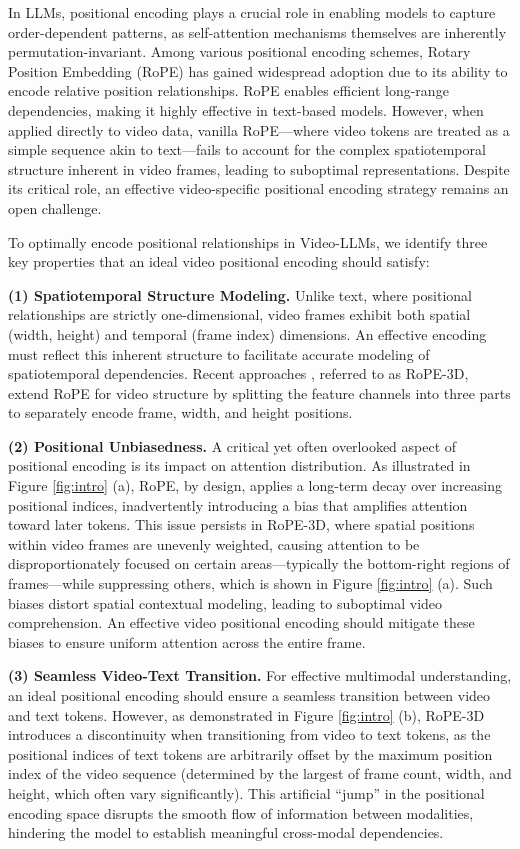\documentclass[11pt]{article}
\begin{document}
In LLMs, positional encoding plays a crucial role in enabling models to capture order-dependent patterns, as self-attention mechanisms themselves are inherently permutation-invariant. Among various positional encoding schemes, Rotary Position Embedding (RoPE) \cite{su2024roformer} has gained widespread adoption due to its ability to encode relative position relationships. RoPE enables efficient long-range dependencies, making it highly effective in text-based models. However, when applied directly to video data, vanilla RoPE—where video tokens are treated as a simple sequence akin to text—fails to account for the complex spatiotemporal structure inherent in video frames, leading to suboptimal representations. Despite its critical role, an effective video-specific positional encoding strategy remains an open challenge.

To optimally encode positional relationships in Video-LLMs, we identify three key properties that an ideal video positional encoding should satisfy:

\textbf{(1) Spatiotemporal Structure Modeling.}
Unlike text, where positional relationships are strictly one-dimensional, video frames exhibit both spatial (width, height) and temporal (frame index) dimensions. An effective encoding must reflect this inherent structure to facilitate accurate modeling of spatiotemporal dependencies. 
Recent approaches \cite{wang2024qwen2, bai2025qwen2}, referred to as RoPE-3D, extend RoPE for video structure by splitting the feature channels into three parts to separately encode frame, width, and height positions.

\textbf{(2) Positional Unbiasedness.} A critical yet often overlooked aspect of positional encoding is its impact on attention distribution. As illustrated in Figure \ref{fig:intro} (a), RoPE, by design, applies a long-term decay over increasing positional indices, inadvertently introducing a bias that amplifies attention toward later tokens. This issue persists in RoPE-3D, where spatial positions within video frames are unevenly weighted, causing attention to be disproportionately focused on certain areas—typically the bottom-right regions of frames—while suppressing others, which is shown in Figure \ref{fig:intro} (a). Such biases distort spatial contextual modeling, leading to suboptimal video comprehension. An effective video positional encoding should mitigate these biases to ensure uniform attention across the entire frame.

\textbf{(3) Seamless Video-Text Transition.} For effective multimodal understanding, an ideal positional encoding should ensure a seamless transition between video and text tokens. However, as demonstrated in Figure \ref{fig:intro} (b), RoPE-3D introduces a discontinuity when transitioning from video to text tokens, as the positional indices of text tokens are arbitrarily offset by the maximum position index of the video sequence (determined by the largest of frame count, width, and height, which often vary significantly). This artificial “jump” in the positional encoding space disrupts the smooth flow of information between modalities, hindering the model to establish meaningful cross-modal dependencies.
\end{document}
